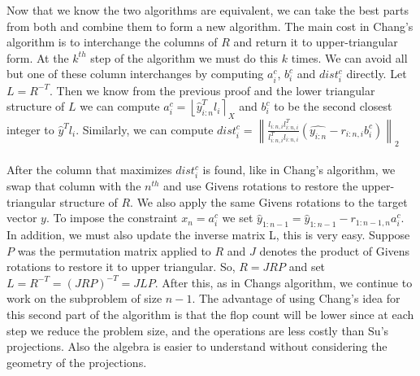 \documentclass[11pt]{article}	%
\numberwithin{algorithm}{section}
\begin{document}
Now that we know the two algorithms are equivalent, we can take the best
parts from both and combine them to form a new algorithm. The main cost in
Chang's algorithm is to interchange the columns of $R$ and return it to
upper-triangular form. At the $k^{th}$ step of the algorithm we
must do this $k$ times. We can avoid all but one of these column interchanges by
computing $a_i^c$, $b_i^c$ and $dist_i^c$ directly. Let $L = R^{-T}$. Then
we know from the previous proof and the lower triangular structure of $L$ we can
compute $a_i^c = \left \lfloor \hat{y}_{i:n}^Tl_i \right \rceil_X$ and $b_i^c$
to be the second closest integer to $\hat{y}^Tl_i$. Similarly, we can compute
$dist_i^c = \left \|
\frac{l_{i:n,i}l_{i:n,i}^T}{l_{i:n,i}^Tl_{i:n,i}}(\hat{y_{i:n}}
-r_{i:n,i}b_i^c) \right \|_2 $\\\\

After the column that maximizes $dist_i^c$ is found, like in Chang's
algorithm, we swap that column with the $n^{th}$ and use Givens rotations to
restore the upper-triangular structure of $R$. We also apply the same Givens
rotations to the target vector $y$. To impose the constraint $x_n = a_i^c$ we
set $\hat{y}_{1:n-1} = \hat{y}_{1:n-1} - r_{1:n-1,n}a_i^c$. In addition, we must
also update the inverse matrix L, this is very easy. Suppose $P$ was the
permutation matrix applied to $R$ and $J$ denotes the product of Givens
rotations to restore it to upper triangular. So, $R = JRP$ and set $L = R^{-T} =
(JRP)^{-T} = JLP$. After this, as in Changs algorithm, we continue to work on
the subproblem of size $n-1$. The advantage of using Chang's idea for this
second part of the algorithm is that the flop count will be lower since at each
step we reduce the problem size, and the operations are less costly than Su's
projections. Also the algebra is easier to understand without considering the
geometry of the projections.
\end{document}
